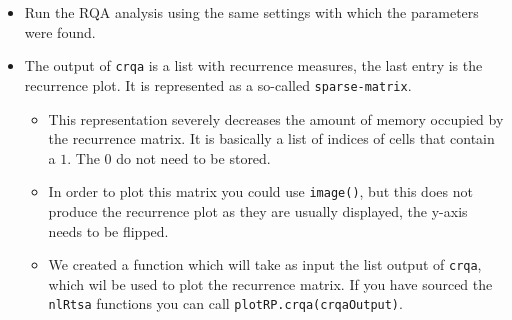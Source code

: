 \documentclass[]{book}
\newenvironment{Shaded}{\begin{snugshade}}{\end{snugshade}}
\newcommand{\KeywordTok}[1]{\textcolor[rgb]{0.13,0.29,0.53}{\textbf{{#1}}}}
\newcommand{\DataTypeTok}[1]{\textcolor[rgb]{0.13,0.29,0.53}{{#1}}}
\newcommand{\StringTok}[1]{\textcolor[rgb]{0.31,0.60,0.02}{{#1}}}
\newcommand{\NormalTok}[1]{{#1}}
\providecommand{\tightlist}{%
  \setlength{\itemsep}{0pt}\setlength{\parskip}{0pt}}
\begin{document}
\begin{itemize}
\tightlist
\item
  Run the RQA analysis using the same settings with which the parameters
  were found.
\end{itemize}

\begin{Shaded}
\end{Shaded}

\begin{itemize}
\tightlist
\item
  The output of \texttt{crqa} is a list with recurrence measures, the
  last entry is the recurrence plot. It is represented as a so-called
  \texttt{sparse-matrix}.

  \begin{itemize}
  \tightlist
  \item
    This representation severely decreases the amount of memory occupied
    by the recurrence matrix. It is basically a list of indices of cells
    that contain a \(1\). The \(0\) do not need to be stored.
  \item
    In order to plot this matrix you could use \texttt{image()}, but
    this does not produce the recurrence plot as they are usually
    displayed, the y-axis needs to be flipped.
  \item
    We created a function which will take as input the list output of
    \texttt{crqa}, which wil be used to plot the recurrence matrix. If
    you have sourced the \texttt{nlRtsa} functions you can call
    \texttt{plotRP.crqa(crqaOutput)}.
  \end{itemize}
\end{itemize}
\end{document}
